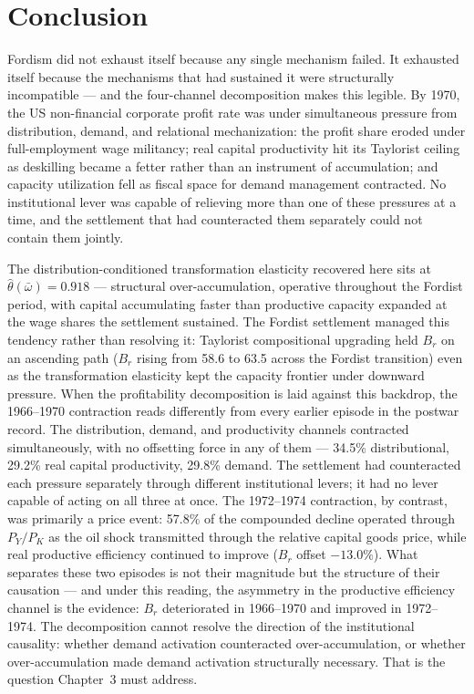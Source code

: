 \documentclass[11pt,a4paper]{article}
\begin{document}
{\section{Conclusion}
\label{ch2:sec:conclusion}

Fordism did not exhaust itself because any single mechanism failed.
It exhausted itself because the mechanisms that had sustained it
were structurally incompatible --- and the four-channel decomposition
makes this legible. By 1970, the US non-financial corporate profit
rate was under simultaneous pressure from distribution, demand, and
relational mechanization: the profit share eroded under
full-employment wage militancy; real capital productivity hit its
Taylorist ceiling as deskilling became a fetter rather than an
instrument of accumulation; and capacity utilization fell as fiscal
space for demand management contracted. No institutional lever was
capable of relieving more than one of these pressures at a time,
and the settlement that had counteracted them separately could not
contain them jointly.

The distribution-conditioned transformation elasticity recovered here
sits at $\hat{\theta}(\bar{\omega}) = 0.918$ --- structural
over-accumulation, operative throughout the Fordist period, with
capital accumulating faster than productive capacity expanded at the
wage shares the settlement sustained. The Fordist settlement managed
this tendency rather than resolving it: Taylorist compositional
upgrading held $B_r$ on an ascending path ($B_r$ rising from 58.6
to 63.5 across the Fordist transition) even as the transformation
elasticity kept the capacity frontier under downward pressure. When
the profitability decomposition is laid against this backdrop, the
1966--1970 contraction reads differently from every earlier episode
in the postwar record. The distribution, demand, and productivity
channels contracted simultaneously, with no offsetting force in any
of them --- 34.5\% distributional, 29.2\% real capital productivity,
29.8\% demand. The settlement had counteracted each pressure
separately through different institutional levers; it had no lever
capable of acting on all three at once. The 1972--1974 contraction,
by contrast, was primarily a price event: 57.8\% of the compounded
decline operated through $P_Y/P_K$ as the oil shock transmitted
through the relative capital goods price, while real productive
efficiency continued to improve ($B_r$ offset $-13.0\%$). What
separates these two episodes is not their magnitude but the structure
of their causation --- and under this reading, the asymmetry in the
productive efficiency channel is the evidence: $B_r$ deteriorated in
1966--1970 and improved in 1972--1974. The decomposition cannot
resolve the direction of the institutional causality: whether demand
activation counteracted over-accumulation, or whether over-accumulation
made demand activation structurally necessary. That is the question
Chapter~3 must address.

}
\end{document}
